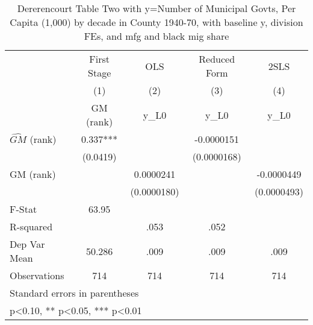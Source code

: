 \begin{table}[htbp]\centering
\def\sym#1{\ifmmode^{#1}\else\(^{#1}\)\fi}
\caption{Dererencourt Table Two with y=Number of Municipal Govts, Per Capita (1,000) by decade in County 1940-70, with baseline y, division FEs, and mfg and black mig share}
\begin{tabular}{l*{4}{c}}
\toprule
                    & First Stage   &         OLS   &Reduced Form   &        2SLS   \\
                    &\multicolumn{1}{c}{(1)}&\multicolumn{1}{c}{(2)}&\multicolumn{1}{c}{(3)}&\multicolumn{1}{c}{(4)}\\
                    &\multicolumn{1}{c}{GM  (rank)}&\multicolumn{1}{c}{y\_L0}&\multicolumn{1}{c}{y\_L0}&\multicolumn{1}{c}{y\_L0}\\
\midrule
$\hat{GM}$ (rank)   &       0.337***&               &  -0.0000151   &               \\
                    &    (0.0419)   &               & (0.0000168)   &               \\
\addlinespace
GM  (rank)          &               &   0.0000241   &               &  -0.0000449   \\
                    &               & (0.0000180)   &               & (0.0000493)   \\
\midrule
F-Stat              &       63.95   &               &               &               \\
R-squared           &               &        .053   &        .052   &               \\
Dep Var Mean        &      50.286   &        .009   &        .009   &        .009   \\
Observations        &         714   &         714   &         714   &         714   \\
\bottomrule
\multicolumn{5}{l}{\footnotesize Standard errors in parentheses}\\
\multicolumn{5}{l}{\footnotesize * p<0.10, ** p<0.05, *** p<0.01}\\
\end{tabular}
\end{table}

